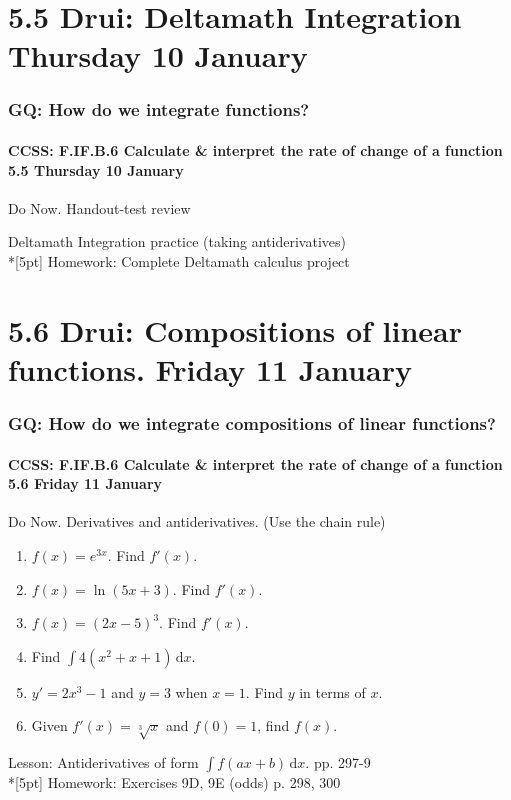 \documentclass{beamer}
\begin{document}
\section{5.5 Drui: Deltamath Integration Thursday 10 January}
\frame
{
  \frametitle{GQ: How do we integrate functions?}
  \framesubtitle{CCSS: F.IF.B.6 Calculate \& interpret the rate of change of a function  \alert{5.5  Thursday 10 January}}

  \begin{block}{Do Now. Handout-test review}

  \end{block}
  Deltamath Integration practice (taking antiderivatives)\\*[5pt]
  Homework: Complete Deltamath calculus project
}

\section{5.6 Drui: Compositions of linear functions. Friday 11 January}
\frame
{
  \frametitle{GQ: How do we integrate compositions of linear functions?}
  \framesubtitle{CCSS: F.IF.B.6 Calculate \& interpret the rate of change of a function  \alert{5.6 Friday 11 January}}

  \begin{block}{Do Now. Derivatives and antiderivatives. (Use the chain rule)}
  \begin{enumerate}
    \item $f(x)=e^{3x}$. Find $f'(x)$.
    \item $f(x)= \ln (5x+3)$. Find $f'(x)$.
    \item $f(x)= (2x-5)^3$. Find $f'(x)$.

    \item Find $\int 4(x^2+x+1) \,\mathrm{d}x$.
    \item $y'=2x^3-1$ and $y=3$ when $x=1$. Find $y$ in terms of $x$.
    \item Given $f'(x)=\sqrt[3]{x}$ and $f(0)=1$, find $f(x)$.
  \end{enumerate}
  \end{block}
  Lesson: Antiderivatives of form $\int f(ax+b) \,\mathrm{d}x$. pp. 297-9\\*[5pt]
  Homework: Exercises 9D, 9E (odds) p. 298, 300
}
\end{document}

